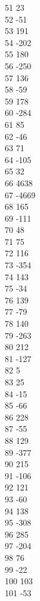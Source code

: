 { 51	23 \\
 52	-51 \\
 53	191 \\
 54	-202 \\
 55	180 \\
 56	-250 \\
 57	136 \\
 58	-59 \\
 59	178 \\
 60	-284 \\
 61	85 \\
 62	-46 \\
 63	71 \\
 64	-105 \\
 65	32 \\
 66	4638 \\
 67	-4669 \\
 68	165 \\
 69	-111 \\
 70	48 \\
 71	75 \\
 72	116 \\
 73	-354 \\
 74	143 \\
 75	-34 \\
 76	139 \\
 77	-79 \\
 78	140 \\
 79	-263 \\
 80	212 \\
 81	-127 \\
 82	5 \\
 83	25 \\
 84	-15 \\
 85	-66 \\
 86	228 \\
 87	-55 \\
 88	129 \\
 89	-377 \\
 90	215 \\
 91	-106 \\
 92	121 \\
 93	-60 \\
 94	138 \\
 95	-308 \\
 96	285 \\
 97	-204 \\
 98	76 \\
 99	-22 \\
 100	103 \\
 101	-53 \\
}
